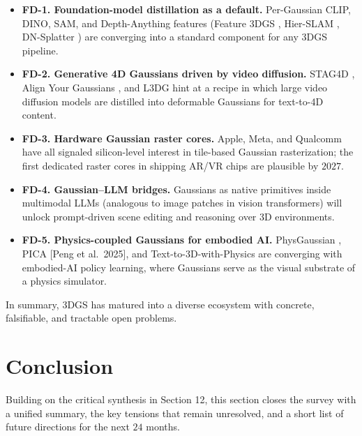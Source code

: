 \documentclass{article}
\begin{document}
\begin{itemize}

\item
  \textbf{FD-1. Foundation-model distillation as a default.} Per-Gaussian CLIP, DINO, SAM, and Depth-Anything features (Feature 3DGS \cite{zhou2024drivinggaussiancom}, Hier-SLAM \cite{li2025hierslamscalingups}, DN-Splatter \cite{turkulainen2025dnsplatterdepthand}) are converging into a standard component for any 3DGS pipeline.
\item
  \textbf{FD-2. Generative 4D Gaussians driven by video diffusion.} STAG4D \cite{zeng2024stag4dspatialtempo}, Align Your Gaussians \cite{ling2024alignyourgaussians}, and L3DG \cite{roessle2024l3dglatent3dgaussi} hint at a recipe in which large video diffusion models are distilled into deformable Gaussians for text-to-4D content.
\item
  \textbf{FD-3. Hardware Gaussian raster cores.} Apple, Meta, and Qualcomm have all signaled silicon-level interest in tile-based Gaussian rasterization; the first dedicated raster cores in shipping AR/VR chips are plausible by \(2027\).
\item
  \textbf{FD-4. Gaussian--LLM bridges.} Gaussians as native primitives inside multimodal LLMs (analogous to image patches in vision transformers) will unlock prompt-driven scene editing and reasoning over 3D environments.
\item
  \textbf{FD-5. Physics-coupled Gaussians for embodied AI.} PhysGaussian \cite{xie2024physgaussianphysic}, PICA {[}Peng et al.~2025{]}, and Text-to-3D-with-Physics \cite{wang2024textto3dgaussiansp} are converging with embodied-AI policy learning, where Gaussians serve as the visual substrate of a physics simulator.
\end{itemize}

In summary, 3DGS has matured into a diverse ecosystem with concrete, falsifiable, and tractable open problems.

\section{Conclusion}\label{conclusion}

Building on the critical synthesis in Section 12, this section closes the survey with a unified summary, the key tensions that remain unresolved, and a short list of future directions for the next \(24\) months.
\end{document}
